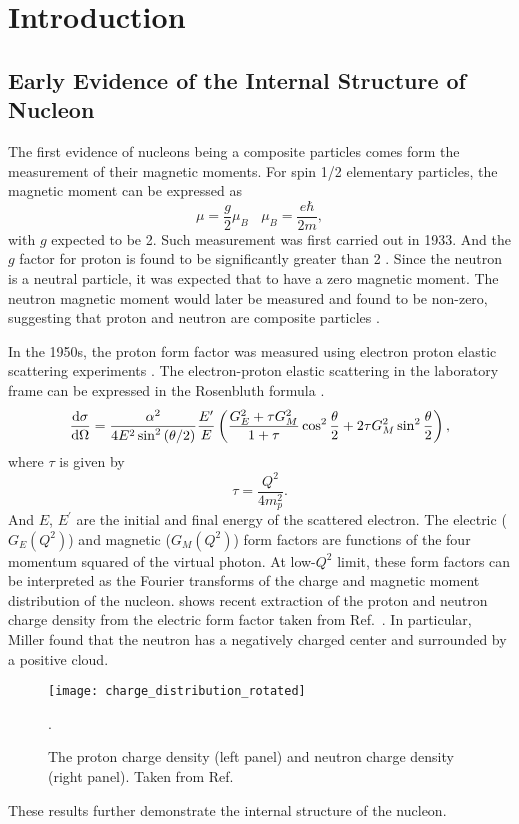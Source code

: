 \documentclass[../main.tex]{subfiles}
\begin{document}
\ifSubfilesClassLoaded{\mainmatter}{}

\chapter{Introduction}
\label{ch:intro}

\section {Early Evidence of the Internal Structure of Nucleon}
The first evidence of nucleons being a composite particles comes form the
measurement of their magnetic moments. For spin 1/2 elementary particles, the
magnetic moment can be expressed as
\begin{equation}
	\mu = \frac{g}{2}\mu_B ~~~~ \mu_B = \frac{e\hbar}{2m},
\end{equation}
with $g$ expected to be \num{2}. Such measurement was first carried out in 1933.
And the $g$ factor for proton is found to be  significantly greater than \num{2}
\cite{frisch1933}. Since the neutron is a neutral particle, it was expected that
to have a zero magnetic moment. The neutron magnetic moment would later be
measured and found to be non-zero, suggesting that proton and neutron are
composite particles \cite{rabi1934a}.

In the 1950s, the proton form factor was measured using electron proton elastic
scattering experiments \cite{hofstadter1956}. The electron-proton elastic
scattering in the laboratory frame can be expressed in the Rosenbluth formula
\cite{rosenbluth1950}.
\begin{equation}
	\dv{\sigma}{\Omega} = \frac{\alpha^2}{4E^2 \sin^2\left(\theta/2\right)}
	\frac{E^\prime}{E} \left( \frac{G_E^2+\tau G_M^2}{1+\tau} \cos^2
	\frac{\theta}{2} + 2\tau G_M^2 \sin^2 \frac{\theta}{2}\right)
	\label{eq:ep_cs},
\end{equation}
where $\tau$ is given by
\begin{equation}
	\tau = \frac{Q^2}{4m_p^2}.
\end{equation}
And $E$, $E^\prime$ are the initial and final energy of the scattered electron.
The electric ($G_E\left(Q^2\right)$) and magnetic ($G_M\left(Q^2\right)$) form
factors are functions of the four momentum squared of the virtual photon. At
low-$Q^2$ limit, these form factors can be interpreted as the Fourier transforms
of the charge and magnetic moment distribution of the nucleon. 
shows recent extraction of the proton and neutron charge density from the electric
form factor taken from Ref.~\cite{miller2007}. In particular, Miller found that
the neutron has a negatively charged center and surrounded by a positive cloud.
\begin{figure}[htbp!]
	\centering
	\texttt{[image: charge\_distribution\_rotated]}
	\caption{The proton charge density (left panel) and neutron charge density
		(right panel). Taken from Ref.~\cite{miller2007}}.
	\label{fig:charge}
\end{figure}
These results further demonstrate the internal structure of the nucleon.
\end{document}
